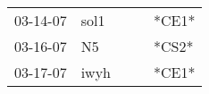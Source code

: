 \begin{supertabular}{p{0.07\textwidth}p{0.06\textwidth}p{0.02\textwidth}p{0.02\textwidth}p{0.06\textwidth}}
 03-14-07\textsuperscript{} &  sol1\textsuperscript{} &   &   &  *CE1* \\
 03-16-07\textsuperscript{} &    N5\textsuperscript{} &   &   &  *CS2* \\
 03-17-07\textsuperscript{} &  iwyh\textsuperscript{} &   &   &  *CE1* \\
\end{supertabular}

